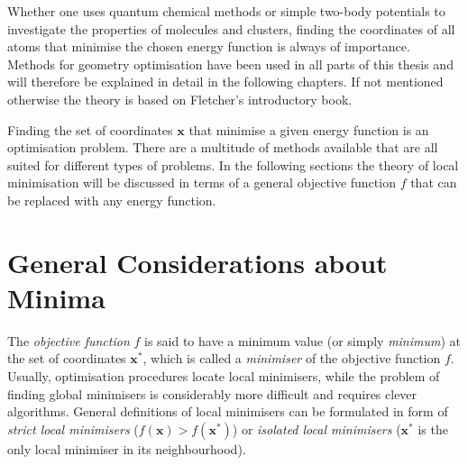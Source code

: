 Whether one uses quantum chemical methods or simple two-body potentials to
investigate the properties of molecules and clusters, finding the coordinates
of all atoms that minimise the chosen energy function is always of importance.
Methods for geometry optimisation have been used in all parts of this thesis
and will therefore be explained in detail in the following chapters. If not
mentioned otherwise the theory is based on
Fletcher's\autocite{Fletcher_Practicalmethodsoptimization_1987} introductory
book.

Finding the set of coordinates $\mathbf{x}$ that minimise a given energy
function is an optimisation problem. There are a multitude of methods available
that are all suited for different types of problems. In the following sections
the theory of local minimisation will be discussed in terms of a general
objective function $f$ that can be replaced with any energy function.

\section{General Considerations about Minima}
\label{sec:GeneralRemarksAboutMinima}

The \textit{objective function} $f$ is said to have a minimum value (or simply
\textit{minimum}) at the set of coordinates $\mathbf{x^*}$, which is called a
\textit{minimiser} of the objective function $f$. Usually, optimisation
procedures locate local minimisers, while the problem of finding global
minimisers is considerably more difficult and requires clever algorithms.
General definitions of local minimisers can be formulated in form of
\textit{strict local minimisers} ($f(\mathbf{x})>f(\mathbf{x^*})$) or
\textit{isolated local minimisers} ($\mathbf{x^*}$ is the only local minimiser
in its neighbourhood).

